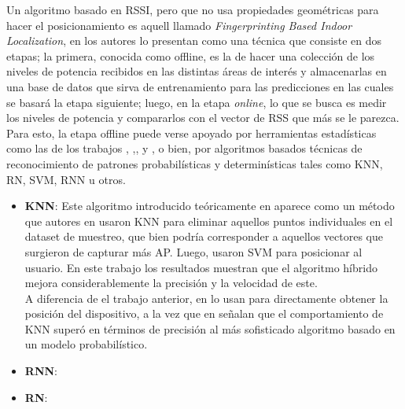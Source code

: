 \begin{enumerate}
{\begin{itemize}
{        Un algoritmo basado en \ac{RSSI}, pero que no usa propiedades geométricas para hacer el posicionamiento es aquell llamado \textit{Fingerprinting Based Indoor Localization}, en \cite{6} los autores lo presentan como una técnica que consiste en dos etapas; la primera, conocida como offline, es la de hacer una colección de los niveles de potencia recibidos en las distintas áreas de interés y almacenarlas en una base de datos que sirva de entrenamiento para las predicciones en las cuales se basará la etapa siguiente; luego, en la etapa \textit{online}, lo que se busca es medir los niveles de potencia y compararlos con el vector de \ac{RSS} que más se le parezca.\\
        
        Para esto, la etapa offline puede verse apoyado por herramientas estadísticas como las de los trabajos \cite{8}, \cite{10},\cite{11},\cite{12} y \cite{14}, o bien, por algoritmos basados técnicas de reconocimiento de patrones probabilísticas y determinísticas tales como KNN, RN, SVM, RNN u otros.
        
        \begin{itemize}
            \item {\textbf{\ac{KNN}}: Este algoritmo introducido teóricamente en \cite{7} aparece como un método que autores en \cite{23} usaron KNN para eliminar aquellos puntos individuales en el dataset de muestreo, que bien podría corresponder a aquellos vectores que surgieron de capturar más AP. Luego, usaron SVM para posicionar al usuario. En este trabajo los resultados muestran que el algoritmo híbrido mejora considerablemente la precisión y la velocidad de este.\\
            
            A diferencia de el trabajo anterior, en \cite{24} lo usan para directamente obtener la posición del dispositivo, a la vez que en \cite{25} señalan que el comportamiento de KNN superó en términos de precisión al más sofisticado algoritmo basado en un modelo probabilístico.}
            
            \item {\textbf{\ac{RNN}}:}
            \item {\textbf{\ac{RN}}: }
        \end{itemize}
        }
    \end{itemize}
        }
\end{enumerate}


                \clearpage 

